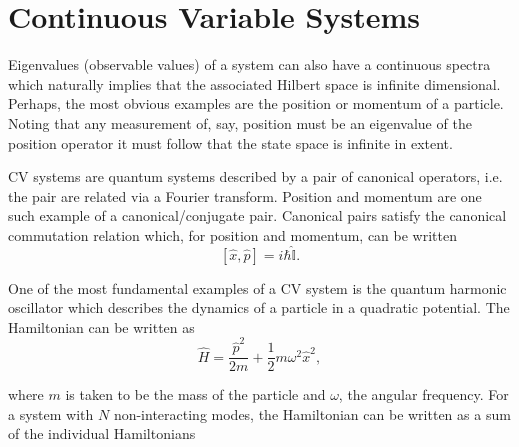 \documentclass[11pt,a4paper]{article}
\numberwithin{equation}{section}
\begin{document}
	\section{Continuous Variable Systems}
	\label{sec:cvs}
	Eigenvalues (observable values) of a system can also have a continuous spectra which naturally implies that the associated Hilbert space is infinite dimensional. Perhaps, the most obvious examples are the position or momentum of a particle. Noting that any measurement of, say, position must be an eigenvalue of the position operator it must follow that the state space is infinite in extent. 
	
	CV systems are quantum systems described by a pair of canonical operators, i.e. the pair are related via a Fourier transform. Position and momentum are one such example of a canonical/conjugate pair. Canonical pairs satisfy the canonical commutation relation which, for position and momentum, can be written \cite{Serafini05}
	\begin{equation} \label{eq:6}
	[\hat{x}, \hat{p}] = i\hbar\hat{\mathbb{I}}.
	\end{equation}
	
	One of the most fundamental examples of a CV system is the quantum harmonic oscillator which describes the dynamics of a particle in a quadratic potential. The Hamiltonian can be written as \cite{Adesso14, Braunstein}
	\begin{equation} \label{eq:7}
	\hat{H} = \frac{\hat{p}^2}{2m} + \frac{1}{2} m\omega^2\hat{x}^2,
	\end{equation}
	
	where $m$ is taken to be the mass of the particle and $\omega$, the angular frequency. For a system with $N$ non-interacting modes, the Hamiltonian can be written as a sum of the individual Hamiltonians 
	
\end{document}
